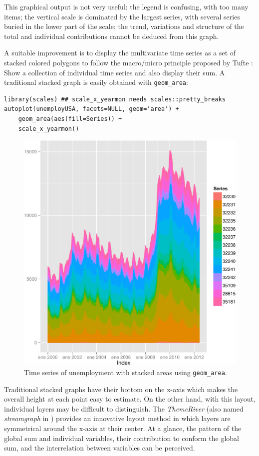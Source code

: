 This graphical output is not very useful: the legend is confusing,
with too many items; the vertical scale is dominated by the largest
series, with several series buried in the lower part of the scale; the
trend, variations and structure of the total and individual
contributions cannot be deduced from this graph.

A suitable improvement is to display the multivariate time series as a
set of stacked colored polygons to follow the macro/micro principle
proposed by Tufte \cite{Tufte1990}: Show a collection of individual
time series and also display their sum. A traditional stacked graph is
easily obtained with \texttt{geom\_area}:
\lstset{language=R,numbers=none}
\begin{lstlisting}
library(scales) ## scale_x_yearmon needs scales::pretty_breaks
autoplot(unemployUSA, facets=NULL, geom='area') +
    geom_area(aes(fill=Series)) +
    scale_x_yearmon()
\end{lstlisting}

\begin{figure}[htb]
\centering
\includegraphics[width=.9\linewidth]{figs/unemployUSAgeomArea.pdf}
\caption{\label{fig:unemployUSAgeomArea}Time series of unemployment with stacked areas using \texttt{geom\_area}.}
\end{figure}

Traditional stacked graphs have their bottom on the x-axis which makes
the overall height at each point easy to estimate. On the other hand,
with this layout, individual layers may be difficult to
distinguish. The \emph{ThemeRiver} \cite{Havre.Hetzler.ea2002} (also named
\emph{streamgraph} in \cite{Byron.Wattenberg2008}) provides an innovative
layout method in which layers are symmetrical around the x-axis at
their center. At a glance, the pattern of the global sum and
individual variables, their contribution to conform the global sum,
and the interrelation between variables can be perceived.

